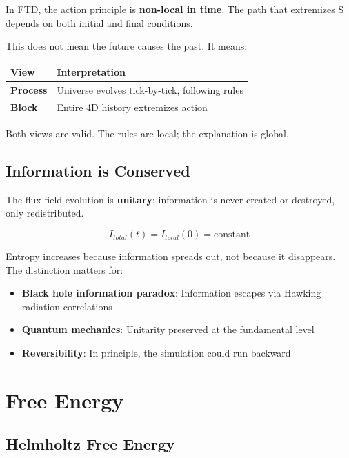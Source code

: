 \documentclass[
  11pt,
  letterpaper,
  twoside,
  openright]{book}
\providecommand{\tightlist}{%
  \setlength{\itemsep}{0pt}\setlength{\parskip}{0pt}}
\begin{document}
In FTD, the action principle is \textbf{non-local in time}. The path
that extremizes S depends on both initial and final conditions.

This does not mean the future causes the past. It means:

\begin{longtable}[]{@{}ll@{}}
\toprule\noalign{}
View & Interpretation \\
\midrule\noalign{}
\endhead
\bottomrule\noalign{}
\endlastfoot
\textbf{Process} & Universe evolves tick-by-tick, following rules \\
\textbf{Block} & Entire 4D history extremizes action \\
\end{longtable}

Both views are valid. The rules are local; the explanation is global.

\subsection{Information is Conserved}\label{information-is-conserved}

The flux field evolution is \textbf{unitary}: information is never
created or destroyed, only redistributed.

\[I_{total}(t) = I_{total}(0) = \text{constant}\]

Entropy increases because information spreads out, not because it
disappears. The distinction matters for:

\begin{itemize}
\tightlist
\item
  \textbf{Black hole information paradox}: Information escapes via
  Hawking radiation correlations
\item
  \textbf{Quantum mechanics}: Unitarity preserved at the fundamental
  level
\item
  \textbf{Reversibility}: In principle, the simulation could run
  backward
\end{itemize}

\section{Free Energy}\label{free-energy}

\subsection{Helmholtz Free Energy}\label{helmholtz-free-energy}
\end{document}
